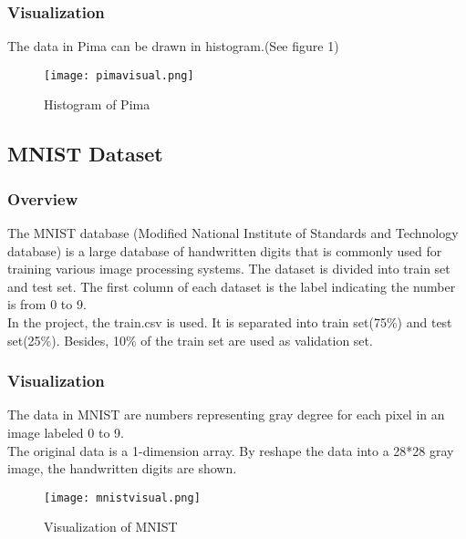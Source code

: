 \documentclass{article}
\begin{document}
\subsubsection{Visualization}

The data in Pima can be drawn in histogram.(See figure 1)

\begin{figure}[htb]
\centering
\texttt{[image: pimavisual.png]}
\caption{Histogram of Pima}
\label{fig2.1.1}
\end{figure}


\subsection{MNIST Dataset}
\subsubsection{Overview}

The MNIST database (Modified National Institute of Standards and Technology database) is a large database of handwritten digits that is commonly used for training various image processing systems. The dataset is divided into train set and test set. The first column of each dataset is the label indicating the number is from 0 to 9.\\
In the project, the train.csv is used. It is separated into train set(75\%) and test set(25\%). Besides, 10\% of the train set are used as validation set.

\subsubsection{Visualization}
The data in MNIST are numbers representing gray degree for each pixel in an image labeled 0 to 9.\\
The original data is a 1-dimension array. By reshape the data into a 28*28 gray image, the handwritten digits are shown.\\
\begin{figure}[H]
\centering

\texttt{[image: mnistvisual.png]}
\caption{Visualization of MNIST}
\label{fig2.2.1}

\end{figure}


\end{document}
